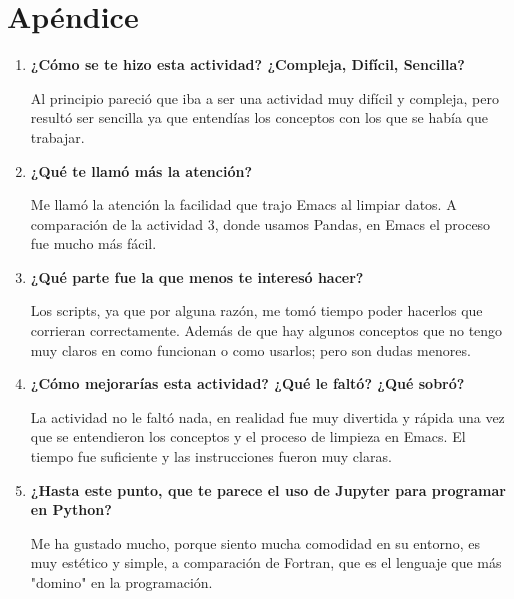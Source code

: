 \documentclass[a4paper]{article}
\begin{document}
\section{Apéndice}
\begin{enumerate}
\item \textbf{¿Cómo se te hizo esta actividad? ¿Compleja, Difícil, Sencilla?}

Al principio pareció que iba a ser una actividad muy difícil y compleja, pero resultó ser sencilla ya que entendías los conceptos con los que se había que trabajar.

\item \textbf{¿Qué te llamó más la atención?}

Me llamó la atención la facilidad que trajo Emacs al limpiar datos. A comparación de la actividad 3, donde usamos Pandas, en Emacs el proceso fue mucho más fácil.

\item \textbf{¿Qué parte fue la que menos te interesó hacer?}

Los scripts, ya que por alguna razón, me tomó tiempo poder hacerlos que corrieran correctamente. Además de que hay algunos conceptos que no tengo muy claros en como funcionan o como usarlos; pero son dudas menores.

\item \textbf{¿Cómo mejorarías esta actividad? ¿Qué le faltó? ¿Qué sobró?}

La actividad no le faltó nada, en realidad fue muy divertida y rápida una vez que se entendieron los conceptos y el proceso de limpieza en Emacs. El tiempo fue suficiente y las instrucciones fueron muy claras.


\item \textbf{¿Hasta este punto, que te parece el uso de Jupyter para programar en Python?}

Me ha gustado mucho, porque siento mucha comodidad en su entorno, es muy estético y simple, a comparación de Fortran, que es el lenguaje que más "domino" en la programación.

\end{enumerate}
\end{document}
